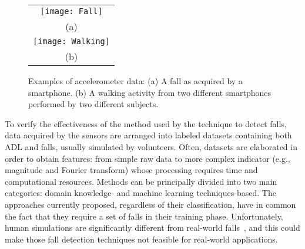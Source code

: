 \documentclass[twocolumn]{svjour3}          \smartqed  \usepackage[draft]{hyperref}
\begin{document}
\begin{figure*}[tb]
  \centering
  \scriptsize
   \setlength{\tabcolsep}{2.1pt}
  \begin{tabular}{c}
  \texttt{[image: Fall]} \\
  (a)\\
    \texttt{[image: Walking]} \\
  (b)\\
   \end{tabular}
  \caption{Examples of accelerometer data: (a) A fall as acquired by a smartphone. (b) A walking activity from two different smartphones performed by two different subjects.}
  \label{fig:accData}
\end{figure*}



To verify the effectiveness of the method used by the technique to detect falls, data acquired by the sensors are arranged into labeled datasets containing both ADL and falls, usually simulated by volunteers. Often, datasets are elaborated in order to obtain features: from simple raw data to more complex indicator (e.g., magnitude and Fourier transform) whose processing requires time and computational resources. Methods can be principally divided into two main categories: domain knowledge- and machine learning techniques-based\linebreak \citep{mirchevska_combining_2014}. The approaches currently proposed, regardless of their classification, have in common the fact that they require a set of falls in their training phase. Unfortunately, human simulations are significantly different from real-world falls~\citep{klenk_comparison_2011}, and this could make those fall detection techniques not feasible for real-world applications.
\end{document}
